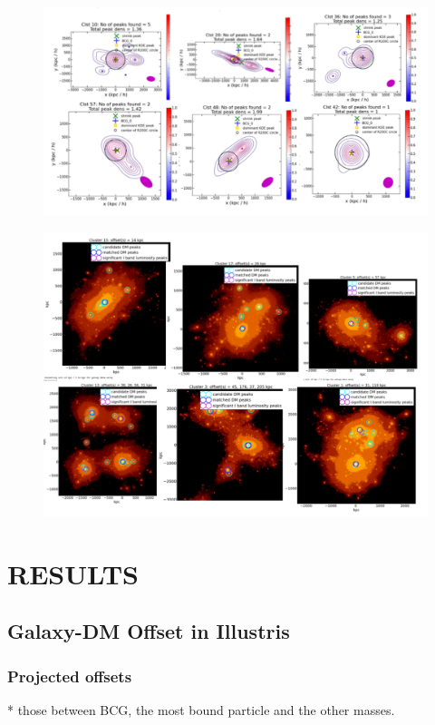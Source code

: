 \documentclass[usenatbib]{mn2e}
\begin{document}
\begin{figure}
	\includegraphics[width=.95\linewidth]{figures/ph_fig_galaxycenter_IllustrisClusters.pdf}
	\caption{
		\label{fig:config}}
\end{figure}


\begin{figure}
	\includegraphics[width=.95\linewidth]{figures/ph_fig_DMcenter_IllustrisClusters.pdf}
	\caption{
		\label{fig:config}}
\end{figure}

\section{RESULTS} 

\subsection{Galaxy-DM Offset in Illustris}
\subsubsection{Projected offsets}
* those between BCG, the most bound particle and the other masses. 
\end{document}
